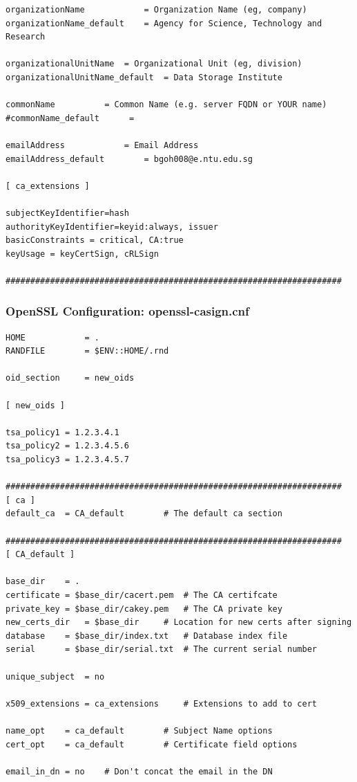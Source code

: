\documentclass[a4paper,12pt]{article}
\begin{document}
{{\begin{verbatim}
organizationName            = Organization Name (eg, company)
organizationName_default    = Agency for Science, Technology and Research

organizationalUnitName  = Organizational Unit (eg, division)
organizationalUnitName_default  = Data Storage Institute

commonName          = Common Name (e.g. server FQDN or YOUR name)
#commonName_default      = 

emailAddress            = Email Address
emailAddress_default        = bgoh008@e.ntu.edu.sg

[ ca_extensions ]

subjectKeyIdentifier=hash
authorityKeyIdentifier=keyid:always, issuer
basicConstraints = critical, CA:true
keyUsage = keyCertSign, cRLSign

####################################################################

\end{verbatim}
\newpage
\subsubsection{OpenSSL Configuration: openssl-casign.cnf}
\begin{verbatim}
HOME			= .
RANDFILE		= $ENV::HOME/.rnd

oid_section		= new_oids

[ new_oids ]

tsa_policy1 = 1.2.3.4.1
tsa_policy2 = 1.2.3.4.5.6
tsa_policy3 = 1.2.3.4.5.7

####################################################################
[ ca ]
default_ca	= CA_default		# The default ca section

####################################################################
[ CA_default ]

base_dir    = .
certificate = $base_dir/cacert.pem  # The CA certifcate
private_key = $base_dir/cakey.pem   # The CA private key
new_certs_dir   = $base_dir     # Location for new certs after signing
database    = $base_dir/index.txt   # Database index file
serial      = $base_dir/serial.txt  # The current serial number

unique_subject  = no  

x509_extensions = ca_extensions     # Extensions to add to cert

name_opt 	= ca_default		# Subject Name options
cert_opt 	= ca_default		# Certificate field options

email_in_dn = no	# Don't concat the email in the DN


\end{verbatim}}}
\end{document}
